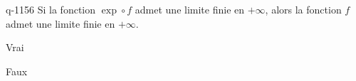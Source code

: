 \begin{truefalse}{q-1156}
Si la fonction $\exp\circ f$ admet une limite finie en $+\infty$, alors la fonction $f$ admet une limite finie en $+\infty$.
\item Vrai
\item* Faux
\end{truefalse}

